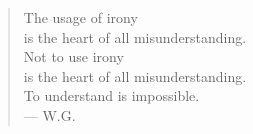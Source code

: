 \begin{verse}
The usage of irony\\
is the heart of all misunderstanding. \\
Not to use irony\\
is the heart of all misunderstanding. \\
To understand is impossible. \\
--- W.G.
\end{verse}

